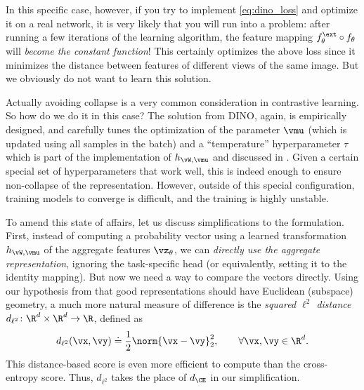 \documentclass[../../book-main.tex]{subfiles}
\begin{document}
In this specific case, however, if you try to implement
\eqref{eq:dino_loss} and optimize it on a real network, it is very
likely that you will run into a problem: after running a few
iterations of the learning algorithm, the feature mapping
\(f_{\theta}^{\ext} \circ f_{\theta}\) will \textit{become the
constant function}! This certainly optimizes the above loss since it
minimizes the distance between features of different views of the
same image. But we obviously do not want to learn this solution.

Actually avoiding collapse is a very common consideration in
contrastive learning. So how do we do it in this case? The solution
from DINO, again, is empirically designed, and carefully tunes the
optimization of the parameter \(\vmu\) (which is updated using all
samples in the batch) and a ``temperature'' hyperparameter \(\tau\)
which is part of the implementation of \(h_{\vW, \vmu}\) and
discussed in . Given a
certain special set of hyperparameters that work well, this is indeed
enough to ensure non-collapse of the representation. However, outside
of this special configuration, training models to converge is
difficult, and the training is highly unstable.

To amend this state of affairs, let us discuss simplifications to the
formulation. First, instead of computing a probability vector using a
learned transformation \(h_{\vW, \vmu}\) of the aggregate features
\(\vz_{\theta}\), we can \textit{directly use the aggregate
representation}, ignoring the task-specific head (or equivalently,
setting it to the identity mapping). But now we need a way to compare
the vectors directly. Using our hypothesis from
 that good representations should have
Euclidean (subspace) geometry, a much more natural measure of
difference is the \textit{squared \(\ell^{2}\) distance}
\(d_{\ell^{2}} \colon \R^{d} \times \R^{d} \to \R\), defined as
\begin{equation}\label{eq:cosine_similarity}
    d_{\ell^{2}}(\vx, \vy) \doteq \frac{1}{2}\norm{\vx -
    \vy}_{2}^{2}, \qquad  \forall \vx, \vy \in \R^{d}.
\end{equation}
This distance-based score is even more efficient to compute than the
cross-entropy score. Thus, \(d_{\ell^{2}}\) takes the place of
\(d_{\CE}\) in our simplification.
\end{document}
